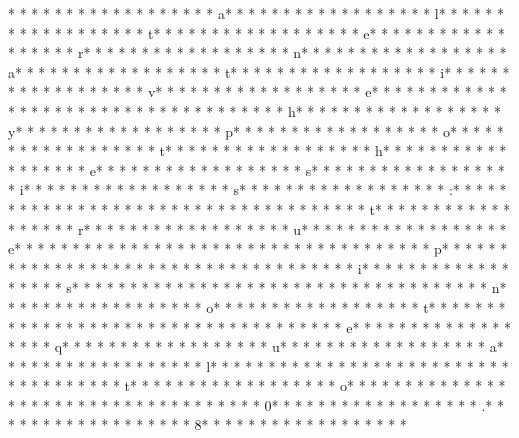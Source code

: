 * * *  * * *  * * *  *  * * *  *  * * *  * a* * *  * * *  * * *  *  * * *  *  * * *  * l* * *  * * *  * * *  *  * * *  *  * * *  * t* * *  * * *  * * *  *  * * *  *  * * *  * e* * *  * * *  * * *  *  * * *  *  * * *  * r* * *  * * *  * * *  *  * * *  *  * * *  * n* * *  * * *  * * *  *  * * *  *  * * *  * a* * *  * * *  * * *  *  * * *  *  * * *  * t* * *  * * *  * * *  *  * * *  *  * * *  * i* * *  * * *  * * *  *  * * *  *  * * *  * v* * *  * * *  * * *  *  * * *  *  * * *  * e* * *  * * *  * * *  *  * * *  *  * * *  *  * * *  * * *  * * *  *  * * *  *  * * *  * h* * *  * * *  * * *  *  * * *  *  * * *  * y* * *  * * *  * * *  *  * * *  *  * * *  * p* * *  * * *  * * *  *  * * *  *  * * *  * o* * *  * * *  * * *  *  * * *  *  * * *  * t* * *  * * *  * * *  *  * * *  *  * * *  * h* * *  * * *  * * *  *  * * *  *  * * *  * e* * *  * * *  * * *  *  * * *  *  * * *  * s* * *  * * *  * * *  *  * * *  *  * * *  * i* * *  * * *  * * *  *  * * *  *  * * *  * s* * *  * * *  * * *  *  * * *  *  * * *  * :* * *  * * *  * * *  *  * * *  *  * * *  *  * * *  * * *  * * *  *  * * *  *  * * *  * t* * *  * * *  * * *  *  * * *  *  * * *  * r* * *  * * *  * * *  *  * * *  *  * * *  * u* * *  * * *  * * *  *  * * *  *  * * *  * e* * *  * * *  * * *  *  * * *  *  * * *  *  * * *  * * *  * * *  *  * * *  *  * * *  * p* * *  * * *  * * *  *  * * *  *  * * *  *  * * *  * * *  * * *  *  * * *  *  * * *  * i* * *  * * *  * * *  *  * * *  *  * * *  * s* * *  * * *  * * *  *  * * *  *  * * *  *  * * *  * * *  * * *  *  * * *  *  * * *  * n* * *  * * *  * * *  *  * * *  *  * * *  * o* * *  * * *  * * *  *  * * *  *  * * *  * t* * *  * * *  * * *  *  * * *  *  * * *  *  * * *  * * *  * * *  *  * * *  *  * * *  * e* * *  * * *  * * *  *  * * *  *  * * *  * q* * *  * * *  * * *  *  * * *  *  * * *  * u* * *  * * *  * * *  *  * * *  *  * * *  * a* * *  * * *  * * *  *  * * *  *  * * *  * l* * *  * * *  * * *  *  * * *  *  * * *  *  * * *  * * *  * * *  *  * * *  *  * * *  * t* * *  * * *  * * *  *  * * *  *  * * *  * o* * *  * * *  * * *  *  * * *  *  * * *  *  * * *  * * *  * * *  *  * * *  *  * * *  * 0* * *  * * *  * * *  *  * * *  *  * * *  * .* * *  * * *  * * *  *  * * *  *  * * *  * 8* * *  * * *  * * *  *  * * *  *  * * *  * 
